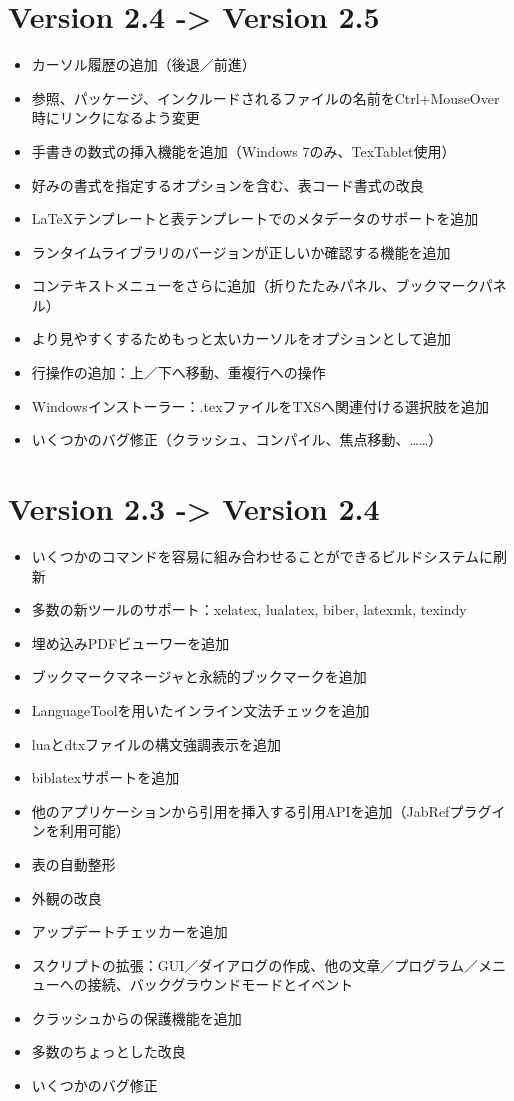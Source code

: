 \section{Version 2.4 -\textgreater{} Version 2.5}

\begin{itemize}
\item
  カーソル履歴の追加（後退／前進）
\item
  参照、パッケージ、インクルードされるファイルの名前をCtrl+MouseOver時にリンクになるよう変更
\item
  手書きの数式の挿入機能を追加（Windows 7のみ、TexTablet使用）
\item
  好みの書式を指定するオプションを含む、表コード書式の改良
\item
  LaTeXテンプレートと表テンプレートでのメタデータのサポートを追加
\item
  ランタイムライブラリのバージョンが正しいか確認する機能を追加
\item
  コンテキストメニューをさらに追加（折りたたみパネル、ブックマークパネル）
\item
  より見やすくするためもっと太いカーソルをオプションとして追加
\item
  行操作の追加：上／下へ移動、重複行への操作
\item
  Windowsインストーラー：.texファイルをTXSへ関連付ける選択肢を追加
\item
  いくつかのバグ修正（クラッシュ、コンパイル、焦点移動、……）
\end{itemize}

\section{Version 2.3 -\textgreater{} Version 2.4}

\begin{itemize}
\item
  いくつかのコマンドを容易に組み合わせることができるビルドシステムに刷新
\item
  多数の新ツールのサポート：xelatex, lualatex, biber, latexmk, texindy
\item
  埋め込みPDFビューワーを追加
\item
  ブックマークマネージャと永続的ブックマークを追加
\item
  LanguageToolを用いたインライン文法チェックを追加
\item
  luaとdtxファイルの構文強調表示を追加
\item
  biblatexサポートを追加
\item
  他のアプリケーションから引用を挿入する引用APIを追加（JabRefプラグインを利用可能）
\item
  表の自動整形
\item
  外観の改良
\item
  アップデートチェッカーを追加
\item
  スクリプトの拡張：GUI／ダイアログの作成、他の文章／プログラム／メニューへの接続、バックグラウンドモードとイベント
\item
  クラッシュからの保護機能を追加
\item
  多数のちょっとした改良
\item
  いくつかのバグ修正
\end{itemize}

